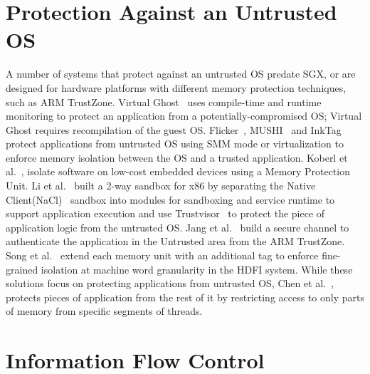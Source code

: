 \section{Protection Against an Untrusted OS}

A number of systems that protect against an untrusted OS predate SGX, or are designed for hardware platforms with different memory protection techniques, such as ARM TrustZone.
Virtual Ghost~\citep{criswell2014virtual} uses compile-time and runtime monitoring to protect an application
from a potentially-compromised OS; Virtual Ghost requires recompilation of the guest OS.
Flicker~\citep{flicker}, MUSHI~\citep{zhang2012mushi} and InkTag~\citep{inktag} protect applications from untrusted OS using SMM mode or virtualization
to enforce memory isolation between the OS and a trusted application.
Koberl et al.~\citep{koeberl2014trustlite}, isolate software on low-cost embedded devices using a Memory Protection Unit.
Li et al.~\citep{li2014minibox} built a 2-way sandbox for x86 by separating the Native Client(NaCl)~\citep{yee2009native} sandbox into modules for sandboxing and service runtime to support application execution and use Trustvisor~\citep{trustvisor} to protect the piece of application logic from the untrusted OS.
Jang et al.~\citep{jang2015secret} build a secure channel to authenticate the application in the Untrusted area from the ARM TrustZone.
Song et al.~\citep{songhdfi} extend each memory unit with an additional tag
to enforce fine-grained isolation at machine word granularity in the HDFI system.
While these solutions focus on protecting applications from untrusted OS, Chen et  al.~\citep{chenshreds}, protects pieces of application from the rest of it by restricting access to only parts of memory from specific segments of threads.



\section{Information Flow Control}

